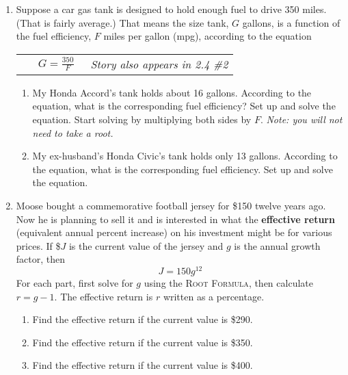 \begin{enumerate}
\newpage %

\item Suppose a car gas tank is designed to hold enough fuel to drive 350 miles. (That is fairly average.)  That means the size tank, $G$ gallons, is a function of the fuel efficiency, $F$ miles per gallon (mpg), according to the equation 

\vspace{-.2in} %
\begin{center}
\begin{tabular} {lcr}
~\hspace{2in} & $\displaystyle G = \frac{350}{F}$ & ~\hspace{.6 in}\emph{Story also appears in 2.4 \#2} \\
\end{tabular}
\end{center}

\begin{enumerate}
\item My Honda Accord's tank holds about 16 gallons.  According to the equation, what is the corresponding fuel efficiency?  Set up and solve the equation.  Start solving by multiplying both sides by $F$.  \emph{Note: you will not need to take a root.} \vfill
\item My ex-husband's Honda Civic's tank holds only 13 gallons.  According to the equation, what is the corresponding fuel efficiency. Set up and solve the equation. \vfill
\end{enumerate}  

\newpage %

\item Moose bought a commemorative football jersey for \$150 twelve years ago.  Now he is planning to sell it and is interested in what the \textbf{effective return} (equivalent annual percent increase) on his investment might be for various prices. If  \$$J$ is the current value of the jersey and $g$ is the annual growth factor, then
 $$J=150g^{12}$$
 For each part, first solve for $g$ using the \textsc{Root Formula}, then calculate $r=g-1$.  The effective return is $r$ written as a percentage.
\begin{enumerate}
\item Find the effective return if the current value is \$290. \vfill
\item Find the effective return if the current value is \$350. \vfill
\item Find the effective return if the current value is \$400. \vfill
\end{enumerate}

\end{enumerate}



